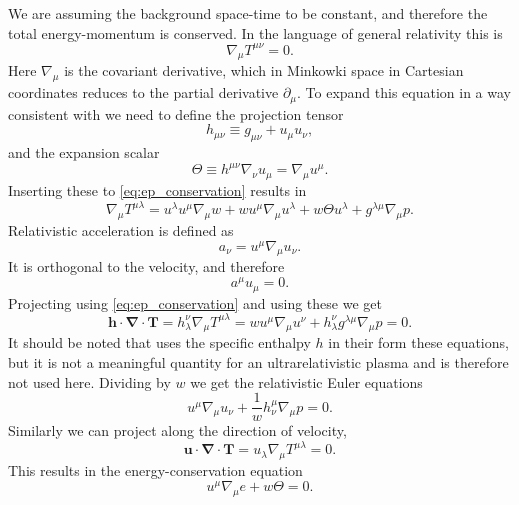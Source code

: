 We are assuming the background space-time to be constant, and therefore the total energy-momentum is conserved.
In the language of general relativity this is
\begin{equation}
\nabla_\mu T^{\mu\nu} = 0.
\label{eq:ep_conservation}
\end{equation}
Here $\nabla_\mu$ is the covariant derivative, which in Minkowki space in Cartesian coordinates reduces to the partial derivative $\partial_\mu$.
To expand this equation in a way consistent with \cite[ch. 3.3]{rezzolla_relativistic_2013} we need to define the projection tensor
\cite[eq. 3.9]{rezzolla_relativistic_2013}
\begin{equation}
h_{\mu\nu} \equiv g_{\mu\nu} + u_\mu u_\nu,
\label{eq:projection_tensor}
\end{equation}
and the expansion scalar
\cite[eq. 3.13]{rezzolla_relativistic_2013}
\begin{equation}
\Theta \equiv h^{\mu\nu} \nabla_\nu u_\mu = \nabla_\mu u^\mu.
\end{equation}
Inserting these to \eqref{eq:ep_conservation} results in
\begin{equation}
\nabla_\mu T^{\mu \lambda} = u^\lambda u^\mu \nabla_\mu w + w u^\mu \nabla_\mu u^\lambda + w \Theta u^\lambda + g^{\lambda\mu} \nabla_\mu p.
\end{equation}
Relativistic acceleration is defined as
\begin{equation}
a_\nu = u^\mu \nabla_\mu u_\nu.
\end{equation}
It is orthogonal to the velocity, and therefore
\begin{equation}
a^\mu u_\mu = 0.
\end{equation}
Projecting using \eqref{eq:ep_conservation} and using these we get
\cite[eq. 3.54]{rezzolla_relativistic_2013}
\begin{equation}
\bm{h} \cdot \bm{\nabla} \cdot \bm{T}
= h^\nu_\lambda \nabla_\mu T^{\mu \lambda}
= w u^\mu \nabla_\mu u^\nu + h^\nu_\lambda g^{\lambda\mu} \nabla_\mu p
= 0.
\end{equation}
It should be noted that \cite{rezzolla_relativistic_2013} uses the specific enthalpy $h$ in their form these equations, but it is not a meaningful quantity for an ultrarelativistic plasma and is therefore not used here.
Dividing by $w$ we get the relativistic Euler equations
\cite[eq. 3.55]{rezzolla_relativistic_2013}
\begin{equation}
u^\mu \nabla_\mu u_\nu + \frac{1}{w} h^\mu_\nu \nabla_\mu p = 0.
\end{equation}
Similarly we can project along the direction of velocity,
\begin{equation}
\bm{u} \cdot \bm{\nabla} \cdot \bm{T} = u_\lambda \nabla_\mu T^{\mu\lambda} = 0.
\end{equation}
This results in the energy-conservation equation
\cite[eq. 3.57]{rezzolla_relativistic_2013}
\begin{equation}
u^\mu \nabla_\mu e + w \Theta = 0.
\end{equation}

